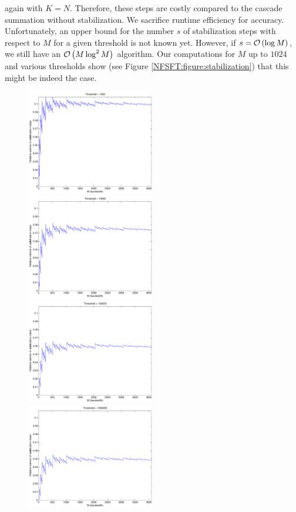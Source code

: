again with $K = N$. Therefore, these steps are costly compared to the cascade summation without stabilization. We sacrifice runtime efficiency for accuracy. 
Unfortunately, an upper bound for the number $s$ of stabilization steps with respect to $M$ for a given threshold is not known yet. However, if $s = \mathcal{O}\left(\log M\right) $, 
we still have an $\mathcal{O}\left(M \log^2 M\right)$ algorithm. Our computations for $M$ up to $1024$ and various thresholds show (see Figure \ref{NFSFT:figure:stabilization}) 
that this might be indeed the case. 
\begin{figure}[htb]
  \centering
   \subfigure
     {\includegraphics[width=0.5\textwidth]{images/stabilization1000}}\hfill
   \subfigure
     {\includegraphics[width=0.5\textwidth]{images/stabilization10000}}\\
   \subfigure
     {\includegraphics[width=0.5\textwidth]{images/stabilization100000}}\hfill
   \subfigure
     {\includegraphics[width=0.5\textwidth]{images/stabilization1000000}}\\

\end{figure}
